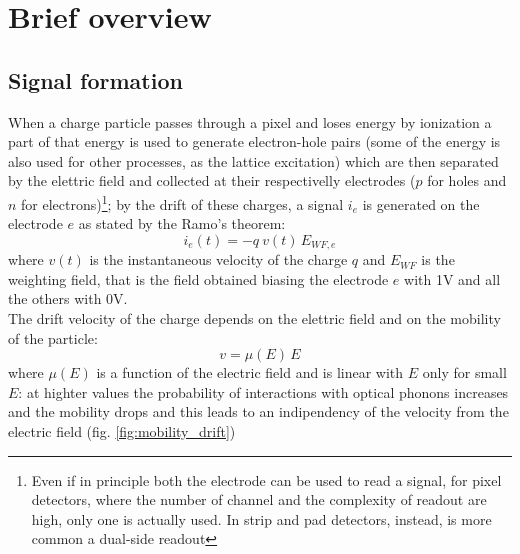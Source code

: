 \label{chip}

\section{Brief overview}
\subsection{Signal formation}
When a charge particle passes through a pixel and loses energy by ionization a part of that energy is used to generate electron-hole pairs (some of the energy is also used for other processes, as the lattice excitation) which are then separated by the elettric field and collected at their respectivelly electrodes ($p$ for holes and $n$ for electrons)\footnote{Even if in principle both the electrode can be used to read a signal, for pixel detectors, where the number of channel and the complexity of readout are high, only one is actually used. In strip and pad detectors, instead, is more common a dual-side readout}; by the drift of these charges, a signal $i_e$ is generated on the  electrode $e$ as stated by the Ramo's theorem: 
\begin{equation}
   i_e(t) = -q\: v(t)\, E_{WF,e}
\end{equation}
where $v(t)$ is the instantaneous velocity of the charge $q$ and $E_{WF}$ is the weighting field, that is the field obtained biasing the electrode $e$ with 1V and all the others with 0V.\\
The drift velocity of the charge depends on the elettric field and on the mobility of the particle:
\begin{equation}
   v = \mu(E)\, E
\end{equation}
where $\mu(E)$ is a function of the electric field and is linear with $E$ only for small $E$: at highter values the probability
of interactions with optical phonons increases and the mobility drops and this leads to an indipendency of the velocity from the electric field (fig. \ref{fig:mobility_drift})\\
